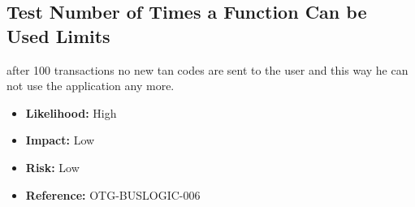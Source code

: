 \subsection{Test Number of Times a Function Can be Used Limits}
after 100 transactions no new tan codes are sent to the user and this way he can not use the application any more.\\
\begin{itemize}
	\item \textbf{Likelihood:} High
	\item \textbf{Impact:} Low
	\item \textbf{Risk:} Low
	\item \textbf{Reference:} OTG-BUSLOGIC-006
\end{itemize}